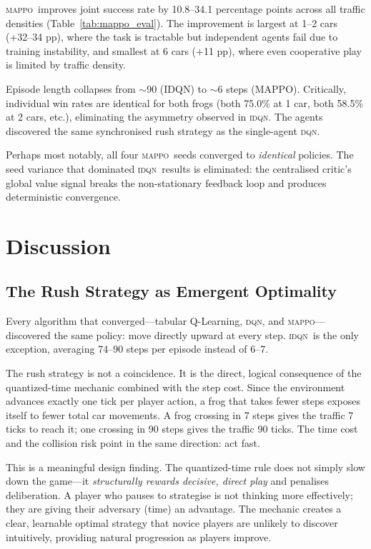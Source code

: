 \documentclass[12pt]{article}
\newcommand{\MAPPO}{\textsc{mappo}}
\newcommand{\IDQN}{\textsc{idqn}}
\newcommand{\DQN}{\textsc{dqn}}
\begin{document}
\MAPPO\ improves joint success rate by 10.8--34.1 percentage points across
all traffic densities (Table~\ref{tab:mappo_eval}).  The improvement is largest
at 1--2 cars (+32--34 pp), where the task is tractable but independent agents
fail due to training instability, and smallest at 6 cars (+11 pp), where even
cooperative play is limited by traffic density.

Episode length collapses from $\sim$90 (IDQN) to $\sim$6 steps (MAPPO).
Critically, individual win rates are identical for both frogs (both 75.0\% at
1 car, both 58.5\% at 2 cars, etc.), eliminating the asymmetry observed in
\IDQN.  The agents discovered the same synchronised rush strategy as the
single-agent \DQN.

Perhaps most notably, all four \MAPPO\ seeds converged to \emph{identical}
policies.  The seed variance that dominated \IDQN\ results is eliminated:
the centralised critic's global value signal breaks the non-stationary
feedback loop and produces deterministic convergence.

\section{Discussion}
\label{sec:discussion}

\subsection{The Rush Strategy as Emergent Optimality}

Every algorithm that converged—tabular Q-Learning, \DQN, and \MAPPO—discovered
the same policy: move directly upward at every step.  \IDQN\ is the only
exception, averaging 74--90 steps per episode instead of 6--7.

The rush strategy is not a coincidence.  It is the direct, logical consequence
of the quantized-time mechanic combined with the step cost.  Since the
environment advances exactly one tick per player action, a frog that takes
fewer steps exposes itself to fewer total car movements.  A frog crossing in
7 steps gives the traffic 7 ticks to reach it; one crossing in 90 steps gives
the traffic 90 ticks.  The time cost and the collision risk point in the same
direction: act fast.

This is a meaningful design finding.  The quantized-time rule does not simply
slow down the game—it \emph{structurally rewards decisive, direct play} and
penalises deliberation.  A player who pauses to strategise is not thinking
more effectively; they are giving their adversary (time) an advantage.  The
mechanic creates a clear, learnable optimal strategy that novice players are
unlikely to discover intuitively, providing natural progression as players
improve.
\end{document}
